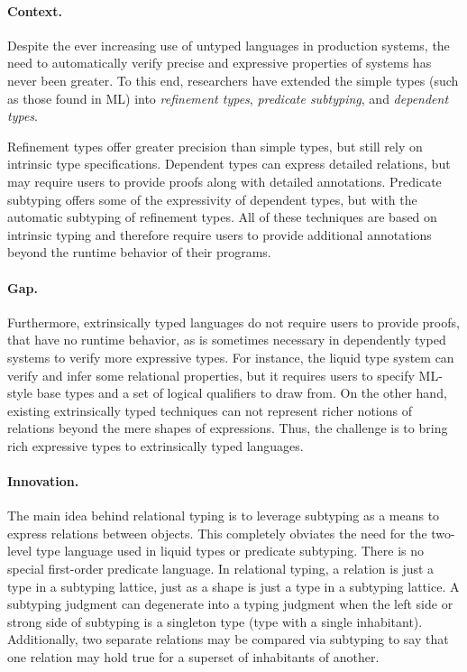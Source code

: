 \documentclass[acmsmall]{acmart}
\theoremstyle{definition}
\begin{document}
\paragraph{Context.} 
Despite the ever increasing use of untyped languages in production systems, 
the need to automatically verify precise and expressive properties of systems has never been greater.
To this end, researchers have extended the simple types (such as those found in ML) into 
\textit{refinement types}, \textit{predicate subtyping}, and \textit{dependent types}. 

Refinement types offer greater precision than simple types, but still rely on intrinsic type specifications.
Dependent types can express detailed relations, but may require users to provide proofs along with detailed annotations.
Predicate subtyping offers some of the expressivity of dependent types, but with the automatic subtyping of refinement types.
All of these techniques are based on intrinsic typing and therefore require users to provide additional annotations
beyond the runtime behavior of their programs.

\paragraph{Gap.} 
Furthermore, extrinsically typed languages do not require users to provide proofs,
that have no runtime behavior, as is sometimes necessary in dependently typed systems to verify more expressive types.   
For instance, the liquid type system \cite{} can verify and infer some relational properties, 
but it requires users to specify ML-style base types and a set of logical qualifiers to draw from.
On the other hand, existing extrinsically typed techniques can not represent richer notions of relations 
beyond the mere shapes of expressions.
Thus, the challenge is to bring rich expressive types to extrinsically typed languages.

\paragraph{Innovation.} 

The main idea behind relational typing is to leverage subtyping as a means to express relations
between objects. This completely obviates the need for the two-level type language
used in liquid types or predicate subtyping. There is no special first-order predicate language. 
In relational typing, a relation is just a type in a subtyping lattice, just as a shape is just  
a type in a subtyping lattice. A subtyping judgment can degenerate into a typing judgment
when the left side or strong side of subtyping is a singleton type (type with a single inhabitant).
Additionally, two separate relations may be compared via subtyping to say that one relation may hold true for a superset of inhabitants 
of another.
\end{document}
